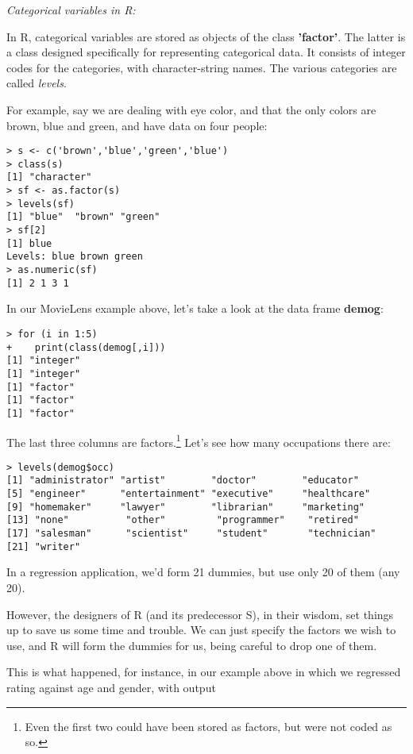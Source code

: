 \textit{Categorical variables in R:}

In R, categorical variables are stored as objects of the class
\textbf{'factor'}.  The latter is a class designed specifically for
representing categorical data.  It consists of integer codes for the
categories, with character-string names.  The various categories are
called \textit{levels}.  

For example, say we are dealing with eye color, and that the only colors
are brown, blue and green, and have data on four people:

\begin{lstlisting}
> s <- c('brown','blue','green','blue')
> class(s)
[1] "character"
> sf <- as.factor(s)
> levels(sf)
[1] "blue"  "brown" "green"
> sf[2]
[1] blue
Levels: blue brown green
> as.numeric(sf)
[1] 2 1 3 1
\end{lstlisting}

In our MovieLens example above, let's take a look at
the data frame \textbf{demog}:

\begin{lstlisting}
> for (i in 1:5) 
+    print(class(demog[,i]))
[1] "integer"
[1] "integer"
[1] "factor"
[1] "factor"
[1] "factor"
\end{lstlisting}

The last three columns are factors.\footnote{Even the first two could
have been stored as factors, but were not coded as so.}  Let's see how
many occupations there are:

\begin{lstlisting}
> levels(demog$occ)
[1] "administrator" "artist"        "doctor"        "educator"     
[5] "engineer"      "entertainment" "executive"     "healthcare"   
[9] "homemaker"     "lawyer"        "librarian"     "marketing"    
[13] "none"          "other"         "programmer"    "retired"      
[17] "salesman"      "scientist"     "student"       "technician"   
[21] "writer"       
\end{lstlisting}

In a regression application, we'd form 21 dummies, but use only 20 of
them (any 20).

However, the designers of R (and its predecessor S), in their wisdom,
set things up to save us some time and trouble.  We can just specify the
factors we wish to use, and R will form the dummies for us, being
careful to drop one of them.

This is what happened, for instance, in our example above in which we
regressed rating against age and gender, with output

